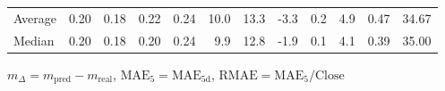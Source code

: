 \begin{threeparttable}
{\begin{tabular}{lrrrrrrrrrrr}
Average &          0.20 &          0.18 &          0.22 &        0.24 &                10.0 &                13.3 &       -3.3 &                 0.2 &              4.9 &            0.47 &                  34.67 \\
 Median &          0.20 &          0.18 &          0.20 &        0.24 &                 9.9 &                12.8 &       -1.9 &                 0.1 &              4.1 &            0.39 &                  35.00 \\
\bottomrule
\end{tabular}
}
\begin{tablenotes}\footnotesize
\item $m_\Delta=m_{\text{pred}}-m_{\text{real}}$,
$\mathrm{MAE}_5=\mathrm{MAE}_{5\text{d}}$,
$\mathrm{RMAE}=\mathrm{MAE}_5/\text{Close}$
\end{tablenotes}
\end{threeparttable}
\endgroup

